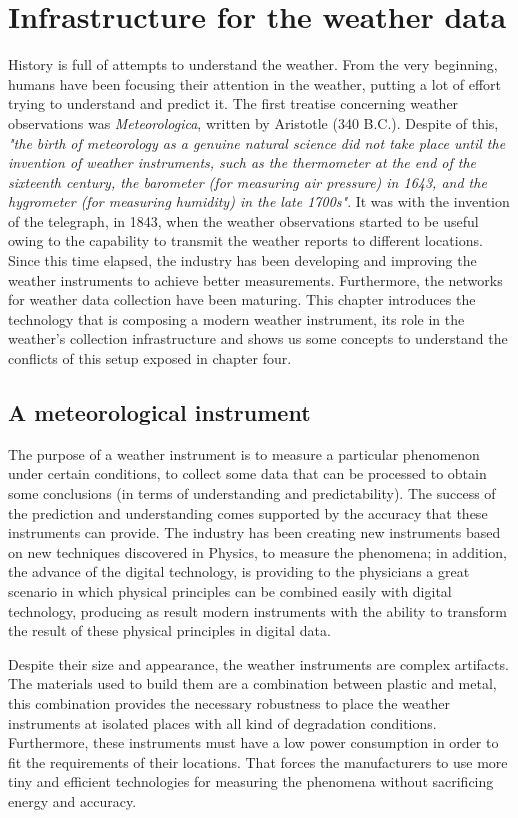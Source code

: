 
\chapter{Infrastructure for the weather data}\label{3}

History is full of attempts to understand the weather. From the very beginning, humans have been focusing their attention in the weather, putting a lot of effort trying to understand and predict it. The first treatise concerning weather observations was \emph{Meteorologica}, written by Aristotle  (340 B.C.). Despite of this, \emph{"the birth of meteorology as a genuine natural science did not take place until the invention of weather instruments, such as the thermometer at the end of the sixteenth century, the barometer (for measuring air pressure) in 1643, and the hygrometer (for measuring humidity) in the late 1700s"}\cite{METO}. It was with the invention of the telegraph, in 1843, when the weather observations started to be useful owing to the capability to transmit the weather reports to different locations. Since this time elapsed, the industry has been developing and improving the weather instruments to achieve better measurements. Furthermore, the networks for weather data collection have been maturing. This chapter introduces the technology that is composing a modern weather instrument, its role in the weather's collection infrastructure and shows us some concepts to understand the conflicts of this setup exposed in chapter four.

\section{A meteorological instrument}

The purpose of a weather instrument is to measure a particular phenomenon under certain conditions, to collect some data that can be processed to obtain some conclusions (in terms of understanding and predictability). The success of the prediction and understanding comes supported by the accuracy that these instruments can provide. The industry has been creating new instruments based on new techniques discovered in Physics, to measure the phenomena; in addition, the advance of the digital technology, is providing to the  physicians a great scenario in which physical principles can be combined easily with digital technology, producing as result modern instruments with the ability to transform the result of these physical principles in digital data.

Despite their size and appearance, the weather instruments are complex artifacts. 
The materials used to build them are a combination between plastic and metal, this combination provides the necessary robustness to place the weather instruments at isolated places with all kind of degradation conditions. Furthermore, these instruments must have a low power consumption in order to fit the requirements of their locations. That forces the manufacturers to use more tiny and efficient technologies for measuring the phenomena without sacrificing energy and accuracy.


